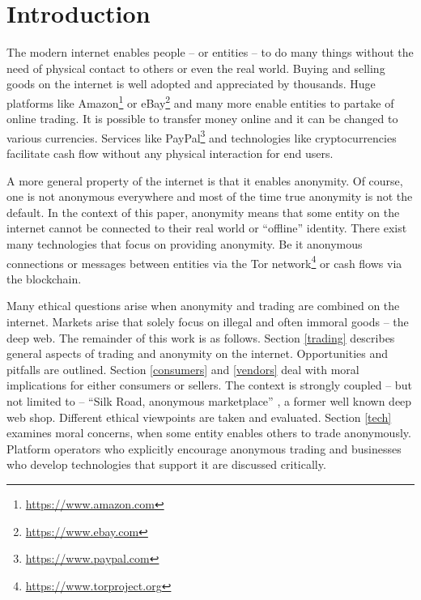 \section{Introduction}


The modern internet enables people -- or entities -- to do many things without the need of physical contact to others or even the real world. Buying and selling goods on the internet is well adopted and appreciated by thousands. Huge platforms like Amazon\footnote{\url{https://www.amazon.com}} or eBay\footnote{\url{https://www.ebay.com}} and many more enable entities to partake of online trading. It is possible to transfer money online and it can be changed to various currencies. Services like PayPal\footnote{\url{https://www.paypal.com}} and technologies like cryptocurrencies facilitate cash flow without any physical interaction for end users.

A more general property of the internet is that it enables anonymity. Of course, one is not anonymous everywhere and most of the time true anonymity is not the default. In the context of this paper, anonymity means that some entity on the internet cannot be connected to their real world or ``offline'' identity. There exist many technologies that focus on providing anonymity. Be it anonymous connections or messages between entities via the Tor network\footnote{\url{https://www.torproject.org}} or cash flows via the blockchain.

Many ethical questions arise when anonymity and trading are combined on the internet. Markets arise that solely focus on illegal and often immoral goods -- the deep web. The remainder of this work is as follows. Section \ref{trading} describes general aspects of trading and anonymity on the internet. Opportunities and pitfalls are outlined. Section \ref{consumers} and \ref{vendors} deal with moral implications for either consumers or sellers. The context is strongly coupled -- but not limited to -- ``Silk Road, anonymous marketplace'' \cite{silkroad2013}, a former well known deep web shop. Different ethical viewpoints are taken and evaluated. Section \ref{tech} examines moral concerns, when some entity enables others to trade anonymously. Platform operators who explicitly encourage anonymous trading and businesses who develop technologies that support it are discussed critically.